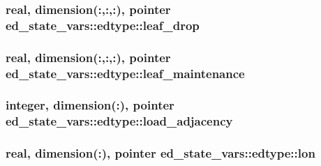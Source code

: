 \subsubsection[{\texorpdfstring{leaf\+\_\+drop}{leaf_drop}}]{\setlength{\rightskip}{0pt plus 5cm}real, dimension(\+:,\+:,\+:), pointer ed\+\_\+state\+\_\+vars\+::edtype\+::leaf\+\_\+drop}\hypertarget{structed__state__vars_1_1edtype_a1b00086f40d99abdf2bc10ce272b135e}{}\label{structed__state__vars_1_1edtype_a1b00086f40d99abdf2bc10ce272b135e}
\subsubsection[{\texorpdfstring{leaf\+\_\+maintenance}{leaf_maintenance}}]{\setlength{\rightskip}{0pt plus 5cm}real, dimension(\+:,\+:,\+:), pointer ed\+\_\+state\+\_\+vars\+::edtype\+::leaf\+\_\+maintenance}\hypertarget{structed__state__vars_1_1edtype_ae42095808a84c030d22003ba9efbe7df}{}\label{structed__state__vars_1_1edtype_ae42095808a84c030d22003ba9efbe7df}
\subsubsection[{\texorpdfstring{load\+\_\+adjacency}{load_adjacency}}]{\setlength{\rightskip}{0pt plus 5cm}integer, dimension(\+:), pointer ed\+\_\+state\+\_\+vars\+::edtype\+::load\+\_\+adjacency}\hypertarget{structed__state__vars_1_1edtype_a852c94c7e750529cadecd69b65b61f89}{}\label{structed__state__vars_1_1edtype_a852c94c7e750529cadecd69b65b61f89}
\subsubsection[{\texorpdfstring{lon}{lon}}]{\setlength{\rightskip}{0pt plus 5cm}real, dimension(\+:), pointer ed\+\_\+state\+\_\+vars\+::edtype\+::lon}\hypertarget{structed__state__vars_1_1edtype_adf3d7b87d2e86ca60877f09d2d5a9a15}{}\label{structed__state__vars_1_1edtype_adf3d7b87d2e86ca60877f09d2d5a9a15}
